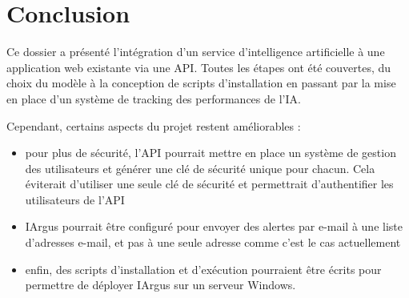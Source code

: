 \documentclass[french]{article}
\begin{document}
    \newpage
    \section*{Conclusion}
    
    Ce dossier a présenté l'intégration d'un service d'intelligence artificielle à une application web existante via une API. Toutes les étapes ont été couvertes, du choix du modèle à la conception de scripts d'installation en passant par la mise en place d'un système de tracking des performances de l'IA.

    Cependant, certains aspects du projet restent améliorables :
    \begin{itemize}
        \item pour plus de sécurité, l'API pourrait mettre en place un système de gestion des utilisateurs et générer une clé de sécurité unique pour chacun. Cela éviterait d'utiliser une seule clé de sécurité et permettrait d'authentifier les utilisateurs de l'API
        \item IArgus pourrait être configuré pour envoyer des alertes par e-mail à une liste d'adresses e-mail, et pas à une seule adresse comme c'est le cas actuellement
        \item enfin, des scripts d'installation et d'exécution pourraient être écrits pour permettre de déployer IArgus sur un serveur Windows.
    \end{itemize}


    
\end{document}
